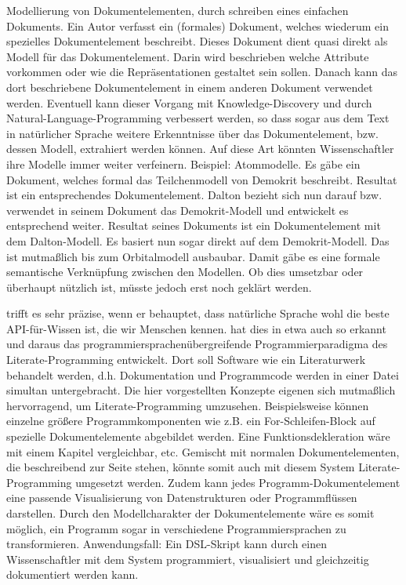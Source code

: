  
Modellierung von Dokumentelementen, durch schreiben eines einfachen Dokuments. Ein Autor verfasst ein (formales) Dokument, welches wiederum ein spezielles Dokumentelement beschreibt. Dieses Dokument dient quasi direkt als Modell für das Dokumentelement. Darin wird beschrieben welche Attribute vorkommen oder wie die Repräsentationen gestaltet sein sollen. Danach kann das dort beschriebene Dokumentelement in einem anderen Dokument verwendet werden. Eventuell kann dieser Vorgang mit Knowledge-Discovery und durch Natural-Language-Programming verbessert werden, so dass sogar aus dem Text in natürlicher Sprache weitere Erkenntnisse über das Dokumentelement, bzw. dessen Modell, extrahiert werden können. Auf diese Art könnten Wissenschaftler ihre Modelle immer weiter verfeinern. Beispiel: Atommodelle. Es gäbe ein Dokument, welches formal das Teilchenmodell von Demokrit beschreibt. Resultat ist ein entsprechendes Dokumentelement. Dalton bezieht sich nun darauf bzw. verwendet in seinem Dokument das Demokrit-Modell und entwickelt es entsprechend weiter. Resultat seines Dokuments ist ein Dokumentelement mit dem Dalton-Modell. Es basiert nun sogar direkt auf dem Demokrit-Modell. Das ist mutmaßlich bis zum Orbitalmodell ausbaubar. Damit gäbe es eine formale semantische Verknüpfung zwischen den Modellen. Ob dies umsetzbar oder überhaupt nützlich ist, müsste jedoch erst noch geklärt werden.

 
\citep[S.~3]{Segaran} trifft es sehr präzise, wenn er behauptet, dass natürliche Sprache wohl die beste API-für-Wissen ist, die wir Menschen kennen. \citep[S.~1]{Knuth} hat dies in etwa auch so erkannt und daraus das programmiersprachenübergreifende Programmierparadigma des Literate-Programming entwickelt. Dort soll Software wie ein Literaturwerk behandelt werden, d.h. Dokumentation und Programmcode werden in einer Datei simultan untergebracht. Die hier vorgestellten Konzepte eigenen sich mutmaßlich hervorragend, um Literate-Programming umzusehen. Beispielsweise können einzelne größere Programmkomponenten wie z.B. ein For-Schleifen-Block auf spezielle Dokumentelemente abgebildet werden. Eine Funktionsdekleration wäre mit einem Kapitel vergleichbar, etc. Gemischt mit normalen Dokumentelementen, die beschreibend zur Seite stehen, könnte somit auch mit diesem System Literate-Programming umgesetzt werden. Zudem kann jedes Programm-Dokumentelement eine passende Visualisierung von Datenstrukturen oder Programmflüssen darstellen. Durch den Modellcharakter der Dokumentelemente wäre es somit möglich, ein Programm sogar in verschiedene Programmiersprachen zu transformieren. Anwendungsfall: Ein DSL-Skript kann durch einen Wissenschaftler mit dem System programmiert, visualisiert und gleichzeitig dokumentiert werden kann.

